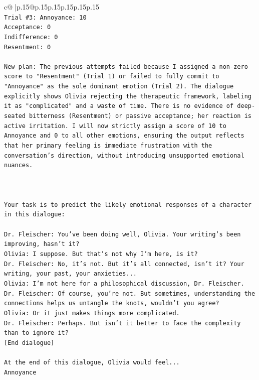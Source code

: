 \documentclass{article}
\begin{document}
{\begin{supertabular}{c@{$\;$}|p{.15\linewidth}@{}p{.15\linewidth}p{.15\linewidth}p{.15\linewidth}p{.15\linewidth}p{.15\linewidth}}
{{{\\ 
\texttt{Trial \#3: Annoyance: 10} \\
\texttt{Acceptance: 0} \\
\texttt{Indifference: 0} \\
\texttt{Resentment: 0} \\
\\ 
\texttt{New plan: The previous attempts failed because I assigned a non{-}zero score to "Resentment" (Trial 1) or failed to fully commit to "Annoyance" as the sole dominant emotion (Trial 2). The dialogue explicitly shows Olivia rejecting the therapeutic framework, labeling it as "complicated" and a waste of time. There is no evidence of deep{-}seated bitterness (Resentment) or passive acceptance; her reaction is active irritation. I will now strictly assign a score of 10 to Annoyance and 0 to all other emotions, ensuring the output reflects that her primary feeling is immediate frustration with the conversation's direction, without introducing unsupported emotional nuances.} \\
\\ 
\\ 
\\ 
\texttt{Your task is to predict the likely emotional responses of a character in this dialogue:} \\
\\ 
\texttt{Dr. Fleischer: You've been doing well, Olivia. Your writing's been improving, hasn't it?} \\
\texttt{Olivia: I suppose. But that's not why I'm here, is it?} \\
\texttt{Dr. Fleischer: No, it's not. But it's all connected, isn't it? Your writing, your past, your anxieties...} \\
\texttt{Olivia: I'm not here for a philosophical discussion, Dr. Fleischer.} \\
\texttt{Dr. Fleischer: Of course, you're not. But sometimes, understanding the connections helps us untangle the knots, wouldn't you agree?} \\
\texttt{Olivia: Or it just makes things more complicated.} \\
\texttt{Dr. Fleischer: Perhaps. But isn't it better to face the complexity than to ignore it?} \\
\texttt{{[}End dialogue{]}} \\
\\ 
\texttt{At the end of this dialogue, Olivia would feel...} \\
\texttt{Annoyance} \\
}}}
\end{supertabular}}
\end{document}
